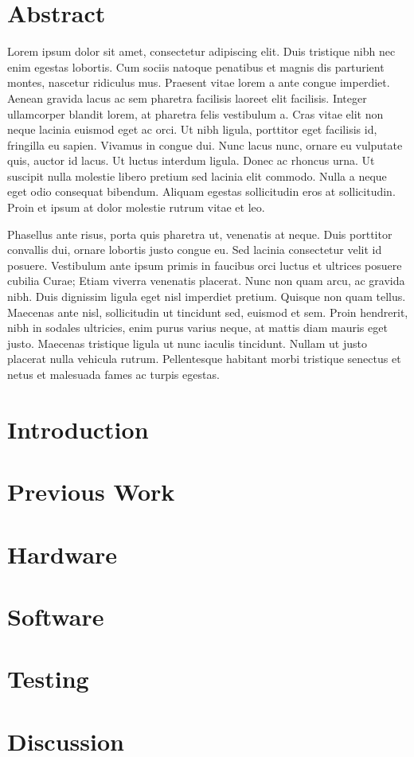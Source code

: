 \section{Abstract}
Lorem ipsum dolor sit amet, consectetur adipiscing elit. Duis tristique
nibh nec enim egestas lobortis. Cum sociis natoque penatibus et magnis
dis parturient montes, nascetur ridiculus mus. Praesent vitae lorem a
ante congue imperdiet. Aenean gravida lacus ac sem pharetra facilisis
laoreet elit facilisis. Integer ullamcorper blandit lorem, at pharetra
felis vestibulum a. Cras vitae elit non neque lacinia euismod eget ac
orci. Ut nibh ligula, porttitor eget facilisis id, fringilla eu
sapien. Vivamus in congue dui. Nunc lacus nunc, ornare eu vulputate
quis, auctor id lacus. Ut luctus interdum ligula. Donec ac rhoncus
urna. Ut suscipit nulla molestie libero pretium sed lacinia elit
commodo. Nulla a neque eget odio consequat bibendum. Aliquam egestas
sollicitudin eros at sollicitudin. Proin et ipsum at dolor molestie
rutrum vitae et leo.

Phasellus ante risus, porta quis pharetra ut, venenatis at neque. Duis
porttitor convallis dui, ornare lobortis justo congue eu. Sed lacinia
consectetur velit id posuere. Vestibulum ante ipsum primis in faucibus
orci luctus et ultrices posuere cubilia Curae; Etiam viverra venenatis
placerat. Nunc non quam arcu, ac gravida nibh. Duis dignissim ligula
eget nisl imperdiet pretium. Quisque non quam tellus. Maecenas ante
nisl, sollicitudin ut tincidunt sed, euismod et sem. Proin hendrerit,
nibh in sodales ultricies, enim purus varius neque, at mattis diam
mauris eget justo. Maecenas tristique ligula ut nunc iaculis
tincidunt. Nullam ut justo placerat nulla vehicula rutrum. Pellentesque
habitant morbi tristique senectus et netus et malesuada fames ac turpis
egestas.

\section{Introduction}
\section{Previous Work}
\section{Hardware}
\section{Software}
\section{Testing}
\section{Discussion}
